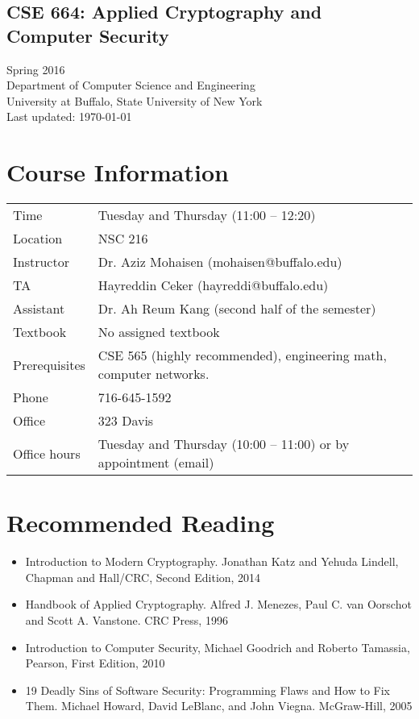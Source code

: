\documentclass[11pt]{article}
\begin{document}
\subsection*{CSE 664: Applied Cryptography and Computer Security}
\noindent Spring 2016\\
Department of Computer Science and Engineering \\
University at Buffalo, State University of New York\\
{\small Last updated: \today}

\section{Course Information}
\noindent
\begin{tabular}{ll}
Time & Tuesday and Thursday (11:00 -- 12:20)\\
Location & NSC 216\\
Instructor & Dr. Aziz Mohaisen (mohaisen@buffalo.edu) \\
TA & Hayreddin Ceker (hayreddi@buffalo.edu)\\
Assistant & Dr. Ah Reum Kang (second half of the semester)\\
Textbook & No assigned textbook\\
Prerequisites & CSE 565 (highly recommended), engineering math, computer networks.\\
Phone & 716-645-1592\\
 Office & 323 Davis\\
Office hours & Tuesday and Thursday (10:00 -- 11:00) or by appointment (email) \\
\end{tabular}


\section{Recommended Reading}

\begin{itemize}
\item Introduction to Modern Cryptography. Jonathan Katz and Yehuda Lindell,
Chapman and Hall/CRC, Second Edition, 2014
\item Handbook of Applied Cryptography. Alfred J. Menezes, Paul C. van Oorschot
and Scott A. Vanstone. CRC Press, 1996
\item Introduction to Computer Security, Michael Goodrich and Roberto Tamassia,
Pearson, First Edition, 2010
\item19 Deadly Sins of Software Security: Programming Flaws and How to Fix
Them. Michael Howard, David LeBlanc, and John Viegna. McGraw-Hill, 2005
\end{itemize}
\end{document}
